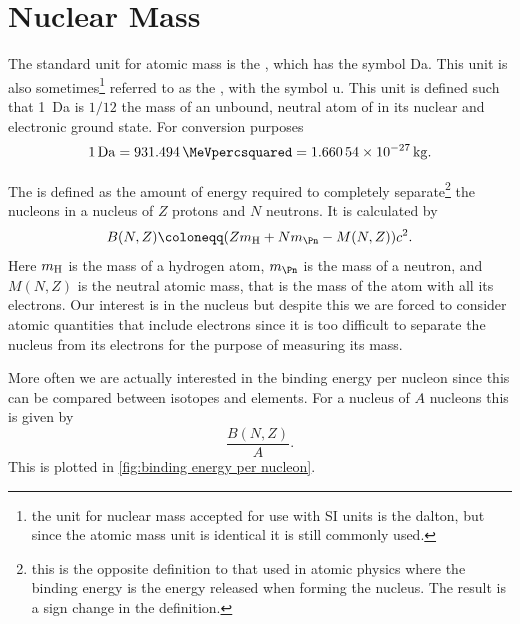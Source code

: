 \documentclass[fleqn]{NotesClass}
\begin{document}
    \section{Nuclear Mass}
    The standard unit for atomic mass is the , which has the symbol \unit{\dalton}.
    This unit is also sometimes\footnote{the unit for nuclear mass accepted for use with SI units is the dalton, but since the atomic mass unit is identical it is still commonly used.} referred to as the , with the symbol \unit{\amu}.
    This unit is defined such that \qty{1}{\dalton} is \(1/12\) the mass of an unbound, neutral atom of  in its nuclear and electronic ground state.
    For conversion purposes
    \begin{equation}
        \qty{1}{\dalton} = \qty{931.494}{\MeVpercsquared} = \qty{1.66054e-27}{\kilogram}.
    \end{equation}
    
    The  is defined as the amount of energy required to completely separate\footnote{this is the opposite definition to that used in atomic physics where the binding energy is the energy released when forming the nucleus. The result is a sign change in the definition.} the nucleons in a nucleus of \(Z\) protons and \(N\) neutrons.
    It is calculated by
    \begin{equation}
        B(N, Z) \coloneqq (Zm_{\ce{H}} + Nm_{\Pn} - M(N, Z))c^2.
    \end{equation}
    Here \(m_{\ce{H}}\) is the mass of a hydrogen atom, \(m_{\Pn}\) is the mass of a neutron, and \(M(N, Z)\) is the neutral atomic mass, that is the mass of the atom with all its electrons.
    Our interest is in the nucleus but despite this we are forced to consider atomic quantities that include electrons since it is too difficult to separate the nucleus from its electrons for the purpose of measuring its mass.
    
    More often we are actually interested in the binding energy per nucleon since this can be compared between isotopes and elements.
    For a nucleus of \(A\) nucleons this is given by
    \begin{equation}
        \frac{B(N, Z)}{A}.
    \end{equation}
    This is plotted in \cref{fig:binding energy per nucleon}.
    
\end{document}
